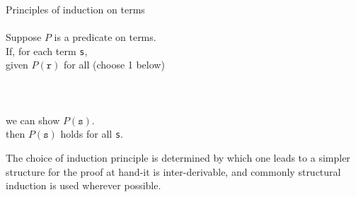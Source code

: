 \documentclass{article}
\begin{document}
\begin{redrules}
\color{red}Principles of induction on terms\color{black}\\\\
Suppose \(P\) is a predicate on terms.\\
If, for each term \texttt{s},\\
\null\qquad given \(P(\texttt{r})\) for all (choose 1 below)\\
\null\qquad \null{}\\
\null\qquad \null{}\\
\null\qquad \null{}\\
\null\qquad we can show \(P(\texttt{s})\).\\
then \(P(\texttt{s})\) holds for all \texttt{s}.
\end{redrules}
The choice of induction principle is determined by which one leads to a simpler structure for the proof at hand-it is inter-derivable, and commonly structural induction is used wherever possible.
\end{document}
